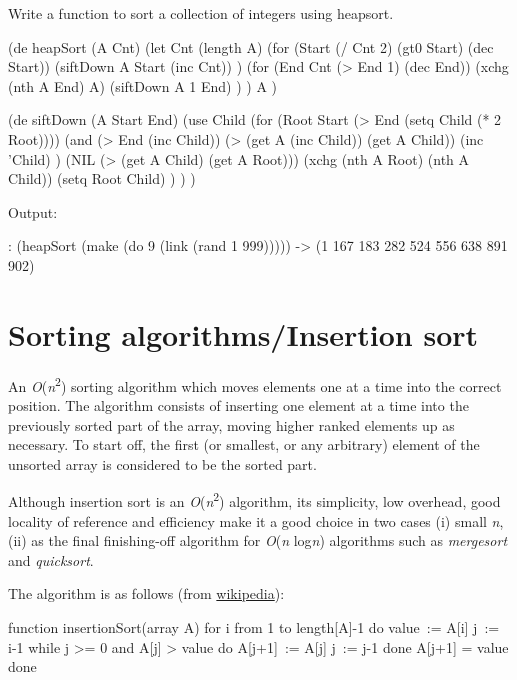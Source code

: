 \begin{itemize}
Write a function to sort a collection of integers using heapsort.

\begin{wideverbatim}

(de heapSort (A Cnt)
   (let Cnt (length A)
      (for (Start (/ Cnt 2) (gt0 Start) (dec Start))
         (siftDown A Start (inc Cnt)) )
      (for (End Cnt (> End 1) (dec End))
         (xchg (nth A End) A)
         (siftDown A 1 End) ) )
   A )

(de siftDown (A Start End)
   (use Child
      (for (Root Start  (> End (setq Child (* 2 Root))))
         (and
            (> End (inc Child))
            (> (get A (inc Child)) (get A Child))
            (inc 'Child) )
         (NIL (> (get A Child) (get A Root)))
         (xchg (nth A Root) (nth A Child))
         (setq Root Child) ) ) )

Output:

: (heapSort (make (do 9 (link (rand 1 999)))))
-> (1 167 183 282 524 556 638 891 902)

\end{wideverbatim}

\pagebreak{}
\section*{Sorting algorithms/Insertion sort}

An \emph{O}(\emph{n}\textsuperscript{2}) sorting algorithm
which moves elements one at a time into the correct position. The
algorithm consists of inserting one element at a time into the
previously sorted part of the array, moving higher ranked elements up as
necessary. To start off, the first (or smallest, or any arbitrary)
element of the unsorted array is considered to be the sorted part.

Although insertion sort is an \emph{O}(\emph{n}\textsuperscript{2})
algorithm, its simplicity, low overhead, good locality of reference
and efficiency make it a good choice in two cases (i) small \emph{n},
(ii) as the final finishing-off algorithm for \emph{O}(\emph{n}
log\emph{n}) algorithms such as \emph{mergesort} and \emph{quicksort}.

The algorithm is as follows (from
\href{http://en.wikipedia.org/wiki/Insertion\_sort\#Algorithm}{wikipedia}):

\begin{wideverbatim}
function insertionSort(array A)
    for i from 1 to length[A]-1 do
        value := A[i] 
        j := i-1
        while j >= 0 and A[j] > value do
            A[j+1] := A[j]
            j := j-1
        done
        A[j+1] = value
    done
\end{wideverbatim}


\end{itemize}
